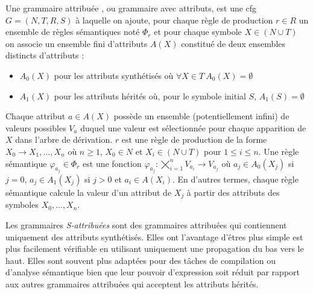 \begin{definition}
    Une grammaire attribuée \cite{knuthSemanticsContextfreeLanguages1968}, ou grammaire avec attributs, est une \gls{cfg} $G = (N, T, R, S)$ à laquelle on ajoute, pour chaque règle de production $r \in R$ un ensemble de règles sémantiques noté $\Phi_r$ et pour chaque symbole $X \in (N \cup T)$ on associe un ensemble fini d'attributs $A(X)$ constitué de deux ensembles distincts d'attributs :
    \begin{itemize}
        \item $A_0(X)$ pour les attributs synthétisés où $\forall X \in T ~ A_0(X) = \emptyset$
        \item $A_1(X)$ pour les attributs hérités où, pour le symbole initial $S$, $A_1(S) = \emptyset$
    \end{itemize}
    Chaque attribut $a \in A(X)$ possède un ensemble (potentiellement infini) de valeurs possibles $V_a$ duquel une valeur est sélectionnée pour chaque apparition de $X$ dans l'arbre de dérivation.
    $r$ est une règle de production de la forme $X_0 \to X_1, \dots, X_n$ où $n \ge 1$, $X_0 \in N$ et $X_i \in (N \cup T)$ pour $1 \le i \le n$.
    Une règle sémantique $\varphi_{a_j} \in \Phi_r$ est une fonction $\varphi_{a_j} : \bigtimes_{i = 1}^n V_{a_i} \to V_{a_j}$ où $a_j \in A_0(X_j)$ si $j = 0$, $a_j \in A_1(X_j)$ si $j > 0$ et $a_i \in A(X_i)$.
    En d'autres termes, chaque règle sémantique calcule la valeur d'un attribut de $X_j$ à partir des attributs des symboles $X_0, \dots, X_n$.
\end{definition}

Les grammaires \emph{S-attribuées} sont des grammaires attribuées qui contiennent uniquement des attributs synthétisés.
Elles ont l'avantage d'êtres plus simple est plus facilement vérifiable en utilisant uniquement une propagation du bas vers le haut.
Elles sont souvent plus adaptées pour des tâches de compilation ou d'analyse sémantique bien que leur pouvoir d'expression soit réduit par rapport aux autres grammaires attribuées qui acceptent les attributs hérités.

